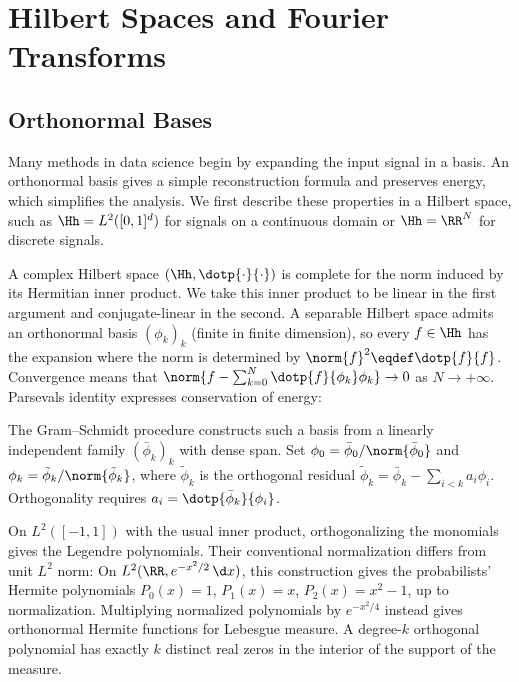 \section{Hilbert Spaces and Fourier Transforms}

                                                
\subsection{Orthonormal Bases}

Many methods in data science begin by expanding the input signal in a basis. An orthonormal basis gives a simple reconstruction formula and preserves energy, which simplifies the analysis. We first describe these properties in a Hilbert space, such as $\Hh=L^2([0,1]^d)$ for signals on a continuous domain or $\Hh=\RR^N$ for discrete signals.

A complex Hilbert space $(\Hh,\dotp{\cdot}{\cdot})$ is complete for the norm induced by its Hermitian inner product. We take this inner product to be linear in the first argument and conjugate-linear in the second. A separable Hilbert space admits an orthonormal basis $(\phi_k)_k$ (finite in finite dimension), so every $f\in\Hh$ has the expansion
where the norm is determined by $\norm{f}^2 \eqdef \dotp{f}{f}$. Convergence means that $\norm{ f - \sum_{k=0}^N \dotp{f}{\phi_k} \phi_k } \rightarrow 0$ as $N \rightarrow +\infty$. Parseval\textquotesingle s identity expresses conservation of energy:

The Gram--Schmidt procedure constructs such a basis from a linearly independent family $(\bar\phi_k)_k$ with dense span. Set $\phi_0=\bar\phi_0/\norm{\bar\phi_0}$ and $\phi_k=\tilde\phi_k/\norm{\tilde\phi_k}$, where $\tilde\phi_k$ is the orthogonal residual $\tilde\phi_k=\bar\phi_k - \sum_{i<k} a_i \phi_i$. Orthogonality requires $a_i = \dotp{\bar \phi_k}{\phi_i}$.

On $L^2([-1,1])$ with the usual inner product, orthogonalizing the monomials gives the Legendre polynomials. Their conventional normalization differs from unit $L^2$ norm:
On $L^2(\RR,e^{-x^2/2}\,\d x)$, this construction gives the probabilists' Hermite polynomials $P_0(x)=1$, $P_1(x)=x$, $P_2(x)=x^2-1$, up to normalization. Multiplying normalized polynomials by $e^{-x^2/4}$ instead gives orthonormal Hermite functions for Lebesgue measure. A degree-$k$ orthogonal polynomial has exactly $k$ distinct real zeros in the interior of the support of the measure.

